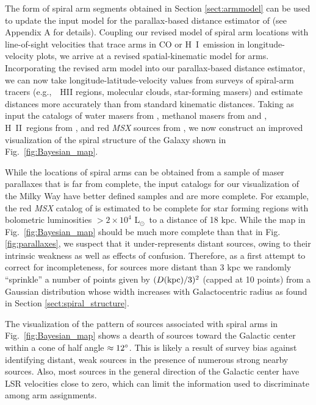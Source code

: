 \documentclass[12pt,preprint]{aastex}
\def\deg  {\ifmmode {^\circ}\else {$^\circ$}\fi}
\def\Lsun {L$_\odot$}
\def\HI   {H~{\small I}}
\def\HII  {H~{\small II}}
\def\eg   {e.g.,~}
\begin{document}
The form of spiral arm segments obtained in Section \ref{sect:armmodel} can be used to 
update the input model for the parallax-based distance estimator of \citet{Reid:16} 
(see Appendix A for details).
Coupling our revised model of spiral arm locations with line-of-sight velocities that trace
arms in CO or \HI\ emission in longitude-velocity plots, we arrive at a revised spatial-kinematic
model for arms.  Incorporating the revised arm model into our parallax-based distance estimator,
we can now take longitude-latitude-velocity values from surveys of spiral-arm tracers (\eg\ HII
regions, molecular clouds, star-forming masers) and estimate distances more accurately than 
from standard kinematic distances.  
Taking as input the catalogs of water masers from \citet{Valdettaro:01}, 
methanol masers from \citet{Pestalozzi:05} and \citet{Green:17},
\HII\ regions from \citet{Anderson:12}, and red {\it MSX} sources from \citet{Urquhart:14}, 
we now construct an improved visualization of the spiral structure of the Galaxy shown in 
Fig.~\ref{fig:Bayesian_map}.   

While the locations of spiral arms can be obtained from a sample of maser parallaxes that is
far from complete, the input catalogs for our visualization of the Milky Way have
better defined samples and are more complete.  For example, the red {\it MSX} catalog of
\citet{Urquhart:14} is estimated to be complete for star forming regions with bolometric
luminosities $>2\times10^4$ \Lsun\ to a distance of 18 kpc.  While the map in 
Fig.~\ref{fig:Bayesian_map} should be much more complete than that in 
Fig. \ref{fig:parallaxes}, we suspect that it under-represents distant sources,
owing to their intrinsic weakness as well as effects of confusion.  Therefore,
as a first attempt to correct for incompleteness, for sources more distant than 3 kpc 
we randomly ``sprinkle'' a number of points given by $(D{\rm (kpc)}/3)^2$ (capped at 10 points) 
from a Gaussian distribution whose width increases with Galactocentric radius
as found in Section \ref{sect:spiral_structure}.

The visualization of the pattern of sources associated with spiral arms in 
Fig.~\ref{fig:Bayesian_map} shows a dearth of sources toward the Galactic center within a cone 
of half angle $\approx12\deg$.  This is likely a result of survey bias against identifying 
distant, weak sources in the presence of numerous strong nearby sources.  Also, most sources
in the general direction of the Galactic center have LSR velocities close to zero, which 
can limit the information used to discriminate among arm assignments.
\end{document}
